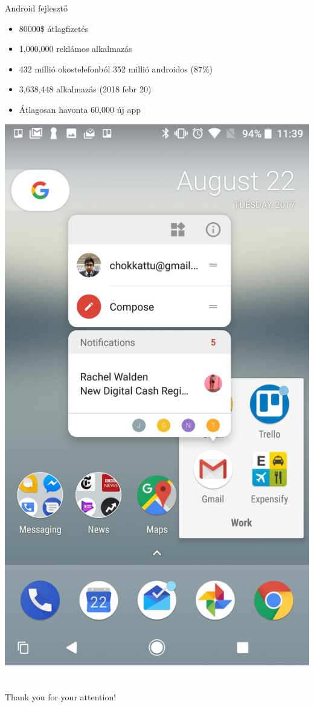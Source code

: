 \documentclass{beamer}
\begin{document}
\begin{frame}[fragile]{Android fejlesztő}
	\begin{minipage}{0.49\textwidth}
		\begin{itemize}
			\item 80000\$ átlagfizetés
			\item 1,000,000 reklámos alkalmazás
			\item 432 millió okostelefonból 352 millió androidos (87\%)
			\item 3,638,448 alkalmazás (2018 febr 20)
			\item Átlagosan havonta 60,000 új app
		\end{itemize}
	\end{minipage}
	\begin{minipage}{.49\textwidth}
		\includegraphics[width=.8\linewidth]{figures/android80.jpg}
	\end{minipage}
\end{frame}
\section{}

\begin{frame}
\centering
\LARGE Thank you for your attention!
\end{frame}
\end{document}

